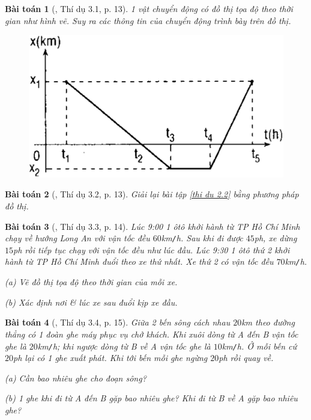 \documentclass{article}
\numberwithin{equation}{section}
\newtheorem{baitoan}{Bài toán}[section]
\begin{document}
\begin{baitoan}[\cite{Giai_Toan_Vat_Ly_10_tap_1}, Thí dụ 3.1, p. 13]
	1 vật chuyển động có đồ thị tọa độ theo thời gian như hình vẽ. Suy ra các thông tin của chuyển động trình bày trên đồ thị.
	
	\begin{figure}[h]
		\centering
		\includegraphics[scale=0.1]{thi_du_3_1}
	\end{figure}
\end{baitoan}

\begin{baitoan}[\cite{Giai_Toan_Vat_Ly_10_tap_1}, Thí dụ 3.2, p. 13]
	Giải lại bài tập \ref{thi du 2.2} bằng phương pháp đồ thị.
\end{baitoan}

\begin{baitoan}[\cite{Giai_Toan_Vat_Ly_10_tap_1}, Thí dụ 3.3, p. 14]
	Lúc 9:00 1 ôtô khởi hành từ TP Hồ Chí Minh chạy về hướng Long An với vận tốc đều $60$\emph{km\texttt{/}h}. Sau khi đi được $45$\emph{ph}, xe dừng $15$\emph{ph} rồi tiếp tục chạy với vận tốc đều như lúc đầu. Lúc 9:30 1 ôtô thứ 2 khởi hành từ TP Hồ Chí Minh đuổi theo xe thứ nhất. Xe thứ 2 có vận tốc đều $70$\emph{km\texttt{/}h}.
	\begin{enumerate*}
		\item[(a)] Vẽ đồ thị tọa độ theo thời gian của mỗi xe.
		\item[(b)] Xác định nơi \& lúc xe sau đuổi kịp xe đầu.
	\end{enumerate*}
\end{baitoan}

\begin{baitoan}[\cite{Giai_Toan_Vat_Ly_10_tap_1}, Thí dụ 3.4, p. 15]
	Giữa 2 bến sông cách nhau $20$\emph{km} theo đường thẳng có 1 đoàn ghe máy phục vụ chở khách. Khi xuôi dòng từ A đến B vận tốc ghe là $20$\emph{km\texttt{/}h}; khi ngược dòng từ B về A vận tốc ghe là $10$\emph{km\texttt{/}h}. Ở mỗi bến cứ $20$\emph{ph} lại có 1 ghe xuất phát. Khi tới bến mỗi ghe ngừng $20$\emph{ph} rồi quay về.
	\begin{enumerate*}
		\item[(a)] Cần bao nhiêu ghe cho đoạn sông?
		\item[(b)] 1 ghe khi đi từ A đến B gặp bao nhiêu ghe? Khi đi từ B về A gặp bao nhiêu ghe?
	\end{enumerate*}
\end{baitoan}
\end{document}
